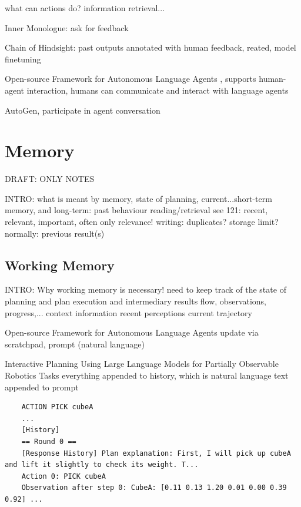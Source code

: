 \documentclass{article}
\begin{document}
what can actions do? information retrieval...

Inner Monologue: ask for feedback

Chain of Hindsight: past outputs annotated with human feedback, reated, model finetuning

\cite{zhou_agents_2023} Open-source Framework for Autonomous Language Agents , supports human-agent interaction, humans can communicate and interact with language agents

\cite{wu_autogen_2023} AutoGen, participate in agent conversation

\FloatBarrier
\section{Memory}
DRAFT: ONLY NOTES

INTRO: what is meant by memory, 
state of planning, current...short-term memory, and long-term: past behaviour 
reading/retrieval 
see 121: recent, relevant, important, often only relevance! 
writing: duplicates? storage limit?
normally: previous result(s)

\subsection{Working Memory}
INTRO: Why working memory is necessary! 
need to keep track of the state of planning and plan execution and intermediary results 
flow, observations, progress,... 
context information 
recent perceptions 
current trajectory 

\cite{zhou_agents_2023} Open-source Framework for Autonomous Language Agents
update via scratchpad, prompt (natural language)

\cite{sun_interactive_2023} Interactive Planning Using Large Language Models for Partially Observable Robotics Tasks
everything appended to history, which is natural language text appended to prompt
\begin{verbatim}
	ACTION PICK cubeA
	...
	[History] 
	== Round 0 == 
	[Response History] Plan explanation: First, I will pick up cubeA and lift it slightly to check its weight. T... 
	Action 0: PICK cubeA 
	Observation after step 0: CubeA: [0.11 0.13 1.20 0.01 0.00 0.39 0.92] ...
\end{verbatim}
\end{document}
